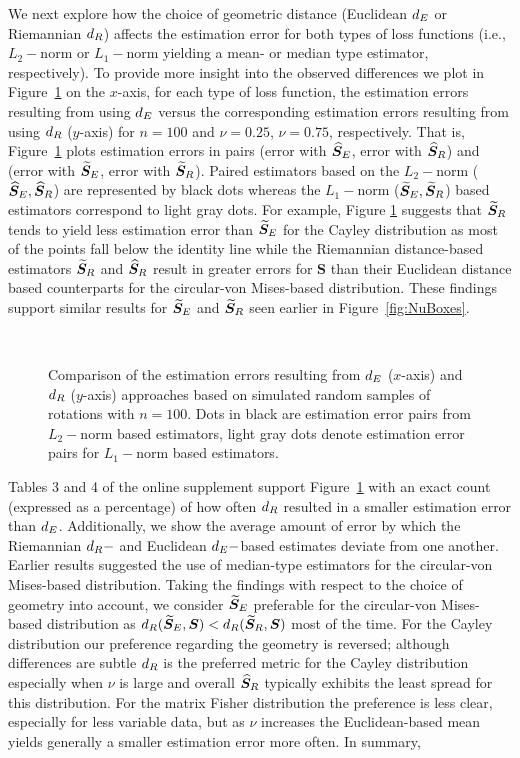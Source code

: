 We next explore how the choice of geometric distance (Euclidean ${d_E}$ or Riemannian ${d_R}$) affects the estimation error for both types of loss functions (i.e., $L_2-$norm or $L_1-$norm yielding a mean- or median type estimator, respectively). To provide more insight into the observed differences we plot in Figure~\ref{fig:comPL2} on the $x$-axis, for each type of loss function,  the estimation errors resulting from using ${d_E}$ versus the corresponding estimation errors resulting from using ${d_R}$ ($y$-axis) for $n=100$ and $\nu=0.25$,  $\nu=0.75$, respectively.  That is, Figure~\ref{fig:comPL2} plots estimation errors in pairs (error with ${\widehat{\bm S}_E}$, error with ${\widehat{\bm S}_R}$) and (error with ${\widetilde{\bm S}_E}$, error with ${\widetilde{\bm S}_R}$). Paired estimators based on the $L_2-$norm (${\widehat{\bm S}_E}, {\widehat{\bm S}_R}$) are represented by black dots whereas the $L_1-$norm (${\widetilde{\bm S}_E}, {\widetilde{\bm S}_R}$) based estimators correspond to light gray dots. For example, Figure \ref{fig:comPL2} suggests that  ${\widetilde{\bm S}_R}$ tends to yield less estimation error than ${\widetilde{\bm S}_E}$  for the Cayley distribution as most of the points fall below the identity line while the Riemannian distance-based estimators ${\widetilde{\bm S}_R}$ and ${\widehat{\bm S}_R}$ result in greater errors for ${\bm S}$ than their Euclidean distance based counterparts for the circular-von Mises-based distribution. These findings support similar results for ${\widetilde{\bm S}_E}$ and ${\widetilde{\bm S}_R}$ seen earlier in Figure~\ref{fig:NuBoxes}.
\begin{figure}[h!]
\centering
{}\\
\caption{Comparison of the estimation errors resulting from ${d_E}$ ($x$-axis) and ${d_R}$ ($y$-axis) approaches based on simulated random samples of rotations with $n=100$.  Dots in black are estimation error pairs from $L_2-$norm based estimators, light gray dots denote estimation error pairs for $L_1-$norm based estimators.}
\label{fig:comPL2}
\end{figure}
Tables 3 and 4 of the online supplement support Figure~\ref{fig:comPL2} with an exact count (expressed as a percentage) of how often ${d_R}$ resulted in a smaller estimation error than ${d_E}$.  Additionally, we show the average amount of error by which the Riemannian ${d_R}-$ and Euclidean ${d_E}-$based estimates deviate from one another.   
Earlier results suggested the use of median-type estimators for the circular-von Mises-based distribution. Taking the findings with respect to the choice of geometry into account, we consider ${\widetilde{\bm S}_E}$ preferable for the circular-von Mises-based distribution as ${d_R}({\widetilde{\bm S}_E},\bm S) < {d_R}({\widetilde{\bm S}_R},\bm S)$ most of the time.  For the Cayley distribution our preference regarding the geometry is reversed; although differences are subtle ${d_R}$ is the preferred metric for the Cayley distribution especially when $\nu$ is large and overall ${\widehat{\bm S}_R}$ typically exhibits the least spread for this distribution.   For the  matrix Fisher distribution the preference is less clear, especially for less variable data, but as $\nu$ increases the Euclidean-based mean yields generally a smaller estimation error more often. In summary,
